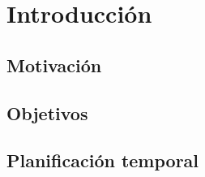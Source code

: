 \section{Introducción}


\subsection{Motivación}

\subsection{Objetivos}

\subsection{Planificación temporal}
